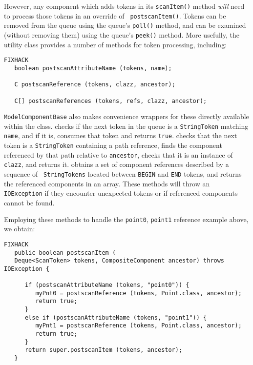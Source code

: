 \documentclass{article}
\begin{document}
However, any component which adds tokens in its {\tt scanItem()}
method {\it will} need to process those tokens in an override of {\tt
postscanItem()}. Tokens can be removed from the queue using
the queue's {\tt poll()} method, and can be examined (without removing
them) using the queue's {\tt peek()} method. More usefully, 
the utility class 
 provides
a number of methods for token processing, including:
\begin{lstlisting}FIXHACK
   boolean postscanAttributeName (tokens, name);

   C postscanReference (tokens, clazz, ancestor);

   C[] postscanReferences (tokens, refs, clazz, ancestor);
\end{lstlisting}
{\tt ModelComponentBase} also makes convenience wrappers for these
directly available within the class.
checks if the next token in the queue is a {\tt StringToken} matching
{\tt name}, and if it is, consumes that token and returns {\tt true}.
checks that the next token is a {\tt StringToken} containing a path
reference, finds the component referenced by that path relative to
{\tt ancestor}, checks that it is an instance of {\tt clazz}, and
returns it.
obtains a set of component references described by a sequence of {\tt
StringTokens} located between {\tt BEGIN} and {\tt END} tokens, and
returns the referenced components in an array.  These methods will
throw an {\tt IOException} if they encounter unexpected tokens or if
referenced components cannot be found.

Employing these methods to handle the 
{\tt point0}, {\tt point1} reference example above, we obtain:
\begin{lstlisting}FIXHACK
   public boolean postscanItem (
   Deque<ScanToken> tokens, CompositeComponent ancestor) throws IOException {

      if (postscanAttributeName (tokens, "point0")) {
         myPnt0 = postscanReference (tokens, Point.class, ancestor);
         return true;
      }
      else if (postscanAttributeName (tokens, "point1")) {
         myPnt1 = postscanReference (tokens, Point.class, ancestor);
         return true;
      }
      return super.postscanItem (tokens, ancestor);
   }
\end{lstlisting}
\end{document}
